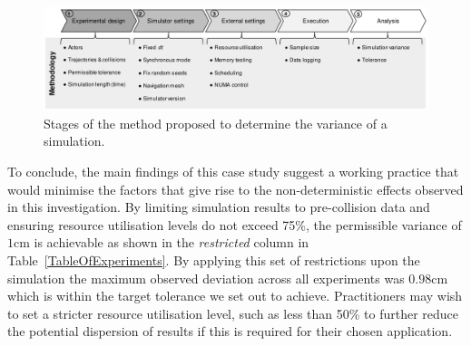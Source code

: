 \documentclass[letterpaper, 10 pt, journal, twoside]{IEEEtran}
\begin{document}
%
\begin{figure}[t]
    \centering
    \includegraphics[width=0.99\linewidth]{Other/Figures/Methodology_Diagram_v7.pdf}
    \caption{Stages of the method proposed to determine the variance of a simulation.}
    \label{method_diagram}
\end{figure}

 
To conclude, the main findings of this case study suggest a working practice that would minimise the factors that give rise to the non-deterministic effects observed in this investigation. 
%
By limiting simulation results to pre-collision data and ensuring resource utilisation levels do not exceed 75\%, the permissible variance of $1$cm is achievable as shown in the \textit{restricted} column in Table~\ref{TableOfExperiments}. By applying this set of restrictions upon the simulation the maximum observed deviation across all experiments was $0.98$cm which is within the target tolerance we set out to achieve. 
%
Practitioners may wish to set a stricter resource utilisation level, such as less than 50\% to further reduce the potential dispersion of results if this is required for their chosen application. 
\end{document}
